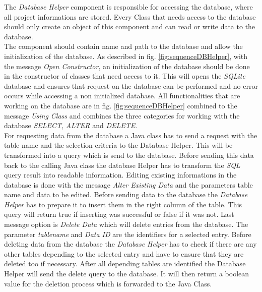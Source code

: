 The \textit{Database Helper} component is responsible for accessing the database, where all project informations are stored. Every Class that needs access to the database should only create an object of this component and can read or write data to the database.\\
The component should contain name and path to the database and allow the initialization of the database. As described in fig. \ref{fig:sequenceDBHelper}, with the message \textit{Open Constructor}, an initialization of the database should be done in the constructor of classes that need access to it. This will opens the \textit{SQLite} database and ensures that request on the database can be performed and no error occurs while accessing a non initialized database. All functionalities that are working on the database are in fig. \ref{fig:sequenceDBHelper} combined to the message \textit{Using Class} and combines the three categories for working with the database \textit{SELECT}, \textit{ALTER} and \textit{DELETE}.\\ 
For requesting data from the database a Java class has to send a request with the table name and the selection criteria to the Database Helper. This will be transformed into a query which is send to the database. Before sending this data back to the calling Java class the database Helper has to transform the \textit{SQL} query result into readable information. Editing existing informations in the database is done with the message \textit{Alter Existing Data} and the parameters table name and data to be edited. Before sending data to the database the \textit{Database Helper} has to prepare it to insert them in the right column of the table. This query will return true if inserting was successful or false if it was not. Last message option is \textit{Delete Data} which will delete entries from the database. The parameter \textit{tablename} and \textit{Data ID} are the identifiers for a selected entry. Before deleting data from the database the \textit{Database Helper} has to check if there are any other tables depending to the selected entry and have to ensure that they are deleted too if necessary. After all depending tables are identified the Database Helper will send the delete query to the database. It will then return a boolean value for the deletion process which is forwarded to the Java Class.

